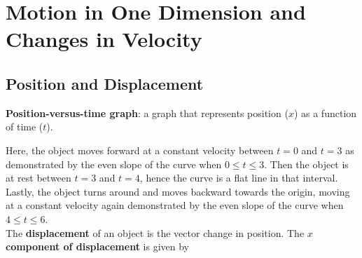 \section{Motion in One Dimension and Changes in Velocity}

    \subsection{Position and Displacement}
        \textbf{Position-versus-time graph}: a graph that represents position ($x$) as a function of time ($t$).

        \begin{center}
        \end{center}

        \noindent Here, the object moves forward at a constant velocity between $t=0$ and $t=3$ as demonstrated by the even slope of the curve when $0\leq t\leq 3$. Then the object is at rest between $t=3$ and $t=4$,
        hence the curve is a flat line in that interval. Lastly, the object turns around and moves backward towards the origin, moving at a constant velocity again demonstrated by the even slope of the curve when
        $4\leq t \leq 6$. \\

        \noindent The \textbf{displacement} of an object is the vector change in position. The \textbf{$x$ component of displacement} is given by

